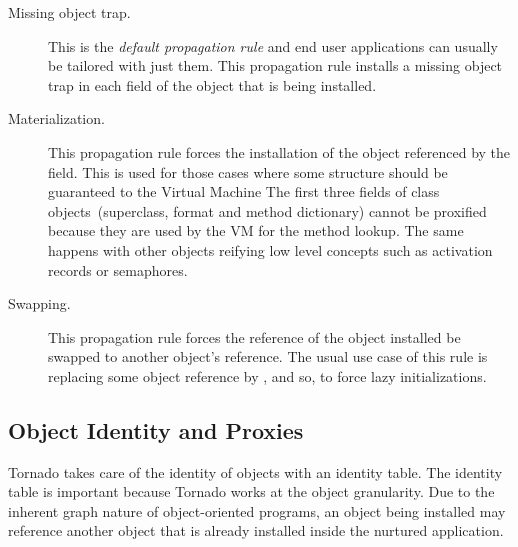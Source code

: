 \begin{description}
\item[Missing object trap.] This is the \emph{default propagation rule} and end user applications can usually be tailored with just them. This propagation rule installs a missing object trap in each field of the object that is being installed.
\item[Materialization.] This propagation rule forces the installation of the object referenced by the field. This is used for those cases where some structure should be guaranteed to the Virtual Machine \eg The first three fields of class objects~(superclass, format and method dictionary) cannot be proxified because they are used by the VM for the method lookup. The same happens with other objects reifying low level concepts such as activation records or semaphores.
\item[Swapping.] This propagation rule forces the reference of the object installed be swapped to another object's reference. The usual use case of this rule is replacing some object reference by , and so, to force lazy initializations.
\end{description}

%

\subsection{Object Identity and Proxies}

Tornado takes care of the identity of objects with an identity table. The identity table is important because Tornado works at the object granularity. Due to the inherent graph nature of object-oriented programs, an object being installed may reference another object that is already installed inside the nurtured application.

